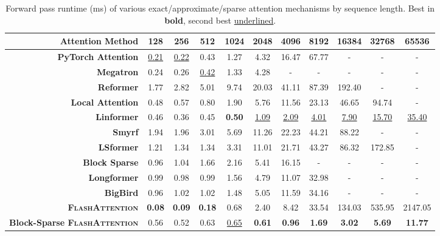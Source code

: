\documentclass{article}
\newcommand{\sysname}{\textsc{FlashAttention}\xspace}
\begin{document}
\begin{table}
\centering
\scriptsize
\captionsetup{font=small}
\caption{Forward pass runtime (ms) of various exact/approximate/sparse attention mechanisms by sequence length. Best in \textbf{bold}, second best \underline{underlined}.}
\begin{tabular}{@{}r|cccccccccc@{}}
\toprule
\textbf{Attention Method} & 128 & 256 & 512 & 1024 & 2048 & 4096 & 8192 & 16384 & 32768 & 65536 \\
\hline
\textbf{PyTorch Attention} & \underline{0.21} & \underline{0.22} & 0.43 & 1.27 & 4.32 & 16.47 & 67.77 & - & - & - \\
\textbf{Megatron} & 0.24 & 0.26 & \underline{0.42} & 1.33 & 4.28 & - & - & - & - & - \\
\hline
\textbf{Reformer} & 1.77 & 2.82 & 5.01 & 9.74 & 20.03 & 41.11 & 87.39 & 192.40 & - & - \\
\textbf{Local Attention} & 0.48 & 0.57 & 0.80 & 1.90 & 5.76 & 11.56 & 23.13 & 46.65 & 94.74 & - \\
\textbf{Linformer} & 0.46 & 0.36 & 0.45 & \textbf{0.50} & \underline{1.09} & \underline{2.09} & \underline{4.01} & \underline{7.90} & \underline{15.70} & \underline{35.40} \\
\textbf{Smyrf} & 1.94 & 1.96 & 3.01 & 5.69 & 11.26 & 22.23 & 44.21 & 88.22 & - & - \\
\textbf{LSformer} & 1.21 & 1.34 & 1.34 & 3.31 & 11.01 & 21.71 & 43.27 & 86.32 & 172.85 & - \\
\hline
\textbf{Block Sparse} & 0.96 & 1.04 & 1.66 & 2.16 & 5.41 & 16.15 & - & - & - & - \\
\textbf{Longformer} & 0.99 & 0.98 & 0.99 & 1.56 & 4.79 & 11.07 & 32.98 & - & - & - \\
\textbf{BigBird} & 0.96 & 1.02 & 1.02 & 1.48 & 5.05 & 11.59 & 34.16 & - & - & - \\
\hline
\textbf{\sysname} & \textbf{0.08} & \textbf{0.09} & \textbf{0.18} & 0.68 & 2.40 & 8.42 & 33.54 & 134.03 & 535.95 & 2147.05 \\
\textbf{Block-Sparse \sysname} & 0.56 & 0.52 & 0.63 & \underline{0.65} & \textbf{0.61} & \textbf{0.96} & \textbf{1.69} & \textbf{3.02} & \textbf{5.69} & \textbf{11.77} \\
\bottomrule
\end{tabular}
\label{tab:forward_pass}
\end{table}
\end{document}
